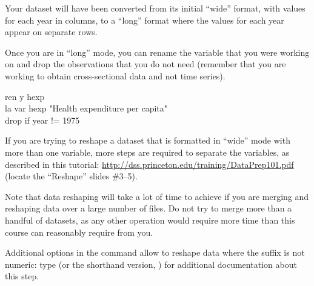 Your dataset will have been converted from its initial \enquote{wide} format, with values for each year in columns, to a \enquote{long} format where the values for each year appear on separate rows.

Once you are in \enquote{long} mode, you can rename the variable that you were working on and drop the observations that you do not need (remember that you are working to obtain cross-sectional data and not time series).

\begin{docspec}
 ren y hexp \\
 la var hexp "Health expenditure per capita" \\
 drop if year != 1975 \\
\end{docspec}

If you are trying to reshape a dataset that is formatted in \enquote{wide} mode with more than one variable, more steps are required to separate the variables, as described in this tutorial: \url{http://dss.princeton.edu/training/DataPrep101.pdf} (locate the \enquote{Reshape} slides \#3–5).

Note that data reshaping will take a lot of time to achieve if you are merging and reshaping data over a large number of files. Do not try to merge more than a handful of datasets, as any other operation would require more time than this course can reasonably require from you.

Additional options in the  command allow to reshape data where the suffix is not numeric: type  (or the shorthand version, ) for additional documentation about this step.

%


